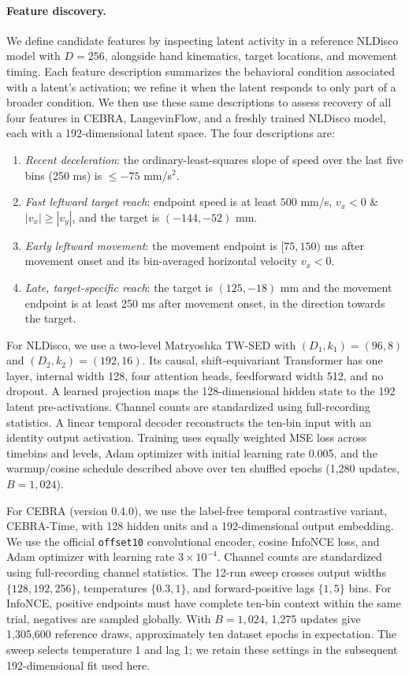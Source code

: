 \paragraph{Feature discovery.}
We define candidate features by inspecting latent activity in a reference NLDisco model with $D = 256$, alongside hand kinematics, target locations, and movement timing. Each feature description summarizes the behavioral condition associated with a latent's activation; we refine it when the latent responds to only part of a broader condition. We then use these same descriptions to assess recovery of all four features in CEBRA, LangevinFlow, and a freshly trained NLDisco model, each with a 192-dimensional latent space. The four descriptions are:
\begin{enumerate}[leftmargin=*,itemsep=2pt]
    \item \textit{Recent deceleration}: the ordinary-least-squares slope of speed over the last five bins (250 ms) is $\leq -75$ mm/s$^2$.
    \item \textit{Fast leftward target reach}: endpoint speed is at least $500$ mm/s, $v_x<0$ \& $|v_x|\geq|v_y|$, and the target is $(-144,-52)$ mm.
    \item \textit{Early leftward movement}: the movement endpoint is $[75,150)$ ms after movement onset and its bin-averaged horizontal velocity $v_x<0$.
    \item \textit{Late, target-specific reach}: the target is $(125,-18)$ mm and the movement endpoint is at least 250 ms after movement onset, in the direction towards the target. 
\end{enumerate}

For NLDisco, we use a two-level Matryoshka TW-SED with $(D_1,k_1)=(96,8)$ and $(D_2,k_2)=(192,16)$. Its causal, shift-equivariant Transformer has one layer, internal width 128, four attention heads, feedforward width 512, and no dropout. A learned projection maps the 128-dimensional hidden state to the 192 latent pre-activations. Channel counts are standardized using full-recording statistics. A linear temporal decoder reconstructs the ten-bin input with an identity output activation. Training uses equally weighted MSE loss across timebins and levels, Adam optimizer with initial learning rate 0.005, and the warmup/cosine schedule described above over ten shuffled epochs (1,280 updates, $B=1,024$).

For CEBRA (version 0.4.0), we use the label-free temporal contrastive variant, CEBRA-Time, with 128 hidden units and a 192-dimensional output embedding. We use the official \texttt{offset10} convolutional encoder, cosine InfoNCE loss, and Adam optimizer with learning rate $3\times10^{-4}$. Channel counts are standardized using full-recording channel statistics. The 12-run sweep crosses output widths $\{128,192,256\}$, temperatures $\{0.3,1\}$, and forward-positive lags $\{1,5\}$ bins. For InfoNCE, positive endpoints must have complete ten-bin context within the same trial, negatives are sampled globally. With $B=1,024$, 1,275 updates give 1,305,600 reference draws, approximately ten dataset epochs in expectation. The sweep selects temperature 1 and lag 1; we retain these settings in the subsequent 192-dimensional fit used here.

